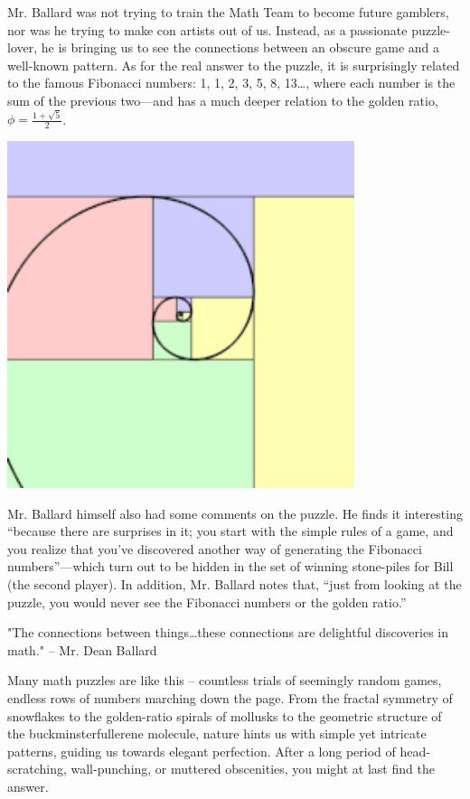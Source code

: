 \documentclass{article}
\begin{document}
Mr. Ballard was not trying to train the Math Team to become future gamblers, nor was he trying to make con artists out of us. Instead, as a passionate puzzle-lover, he is bringing us to see the connections between an obscure game and a well-known pattern.
As for the real answer to the puzzle, it is surprisingly related to the famous Fibonacci numbers: 1, 1, 2, 3, 5, 8, 13…, where each number is the sum of the previous two—and has a much deeper relation to the golden ratio, $\phi = \frac{1+\sqrt{5}}2$.
\begin{center}
    \includegraphics[width=4in]{images/fibonacci_seq.png}
\end{center}

Mr. Ballard himself also had some comments on the puzzle. He finds it interesting “because there are surprises in it; you start with the simple rules of a game, and you realize that you’ve discovered another way of generating the Fibonacci numbers”—which turn out to be hidden in the set of winning stone-piles for Bill (the second player). In addition, Mr. Ballard notes that, “just from looking at the puzzle, you would never see the Fibonacci numbers or the golden ratio.”

"The connections between things…these connections are delightful discoveries in math." -- Mr. Dean Ballard

Many math puzzles are like this – countless trials of seemingly random games, endless rows of numbers marching down the page. From the fractal symmetry of snowflakes to the golden-ratio spirals of mollusks to the geometric structure of the buckminsterfullerene molecule, nature hints us with simple yet intricate patterns, guiding us towards elegant perfection. After a long period of head-scratching, wall-punching, or muttered obscenities, you might at last find the answer.
\end{document}
